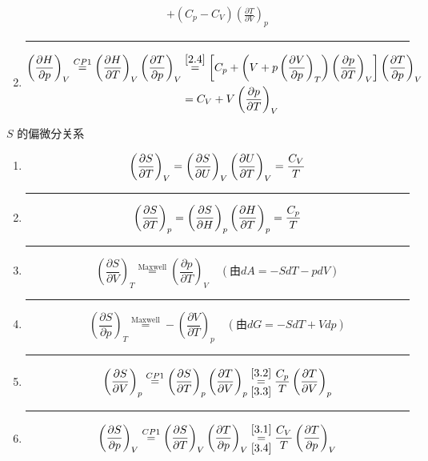 \begin{example}
\begin{enumerate}
\begin{align*}
            +(C_p-C_V)\left(\frac{\partial T}{\partial V}\right)_p
        \end{align*}
        \hrule
        \item \begin{align*}
            \left(\frac{\partial H}{\partial p}\right)_V 
            \overset{CP1}{=} \left(\frac{\partial H}{\partial T}\right)_V 
            \left(\frac{\partial T}{\partial p}\right)_V 
            &\overset{\ref*{2.4}}{=} 
            \left[ C_p + \left( V + p\left(\frac{\partial V}{\partial p}\right)_T \right) 
            \left(\frac{\partial p}{\partial T}\right)_V \right] 
            \left(\frac{\partial T}{\partial p}\right)_V \\
            &=C_V + V\left(\frac{\pa p}{\pa T}\right)_V
        \end{align*}
    \end{enumerate}
\end{example}
\begin{example}
    \( S \) 的偏微分关系
    \begin{enumerate}
        \item\label{3.1} \[\left(\frac{\partial S}{\partial T}\right)_V 
        =\left(\frac{\partial S}{\partial U}\right)_V\left(\frac{\partial U}{\partial T}\right)_V
        = \frac{C_V}{T} 
        \]\hrule
        \item\label{3.2} \[\left(\frac{\partial S}{\partial T}\right)_p 
        =\left(\frac{\partial S}{\partial H}\right)_p\left(\frac{\partial H}{\partial T}\right)_p
        = \frac{C_p}{T} 
        \]\hrule
        \item\label{3.3} \[\left(\frac{\partial S}{\partial V}\right)_T 
        \overset{\text{Maxwell}}{=} \left(\frac{\partial p}{\partial T}\right)_V \quad (\text{由}  dA = -S dT - p dV ) \]
        \hrule
        \item\label{3.4} \[\left(\frac{\partial S}{\partial p}\right)_T 
        \overset{\text{Maxwell}}{=} -\left(\frac{\partial V}{\partial T}\right)_p \quad (\text{由}  dG = -S dT + V dp ) \]
        \hrule
        \item\label{3.5} \begin{align*}
            \left(\frac{\partial S}{\partial V}\right)_p 
            \overset{CP1}{=} \left(\frac{\partial S}{\partial T}\right)_p \left(\frac{\partial T}{\partial V}\right)_p
            \overunderset{\ref*{3.2}}{\ref*{3.3}}{=} 
            \frac{C_p}{T} \left(\frac{\partial T}{\partial V}\right)_p  
        \end{align*}
        \hrule
        \item\label{3.6} \begin{align*}
            \left(\frac{\partial S}{\partial p}\right)_V 
            \overset{CP1}{=} \left(\frac{\partial S}{\partial T}\right)_V \left(\frac{\partial T}{\partial p}\right)_V
            \overunderset{\ref*{3.1}}{\ref*{3.4}}{=} 
            \frac{C_V}{T} \left(\frac{\partial T}{\partial p}\right)_V
        \end{align*}
    \end{enumerate}
\end{example}
